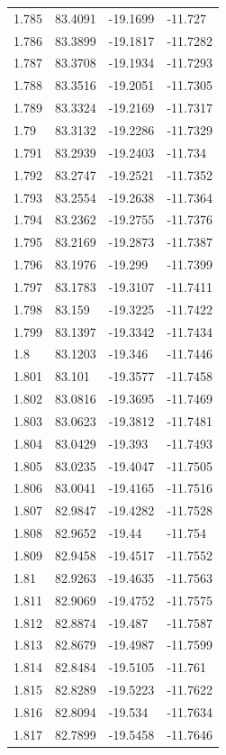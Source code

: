 \begin{tabular}{llll}
1.785 & 83.4091 & -19.1699 & -11.727 \\
1.786 & 83.3899 & -19.1817 & -11.7282 \\
1.787 & 83.3708 & -19.1934 & -11.7293 \\
1.788 & 83.3516 & -19.2051 & -11.7305 \\
1.789 & 83.3324 & -19.2169 & -11.7317 \\
1.79 & 83.3132 & -19.2286 & -11.7329 \\
1.791 & 83.2939 & -19.2403 & -11.734 \\
1.792 & 83.2747 & -19.2521 & -11.7352 \\
1.793 & 83.2554 & -19.2638 & -11.7364 \\
1.794 & 83.2362 & -19.2755 & -11.7376 \\
1.795 & 83.2169 & -19.2873 & -11.7387 \\
1.796 & 83.1976 & -19.299 & -11.7399 \\
1.797 & 83.1783 & -19.3107 & -11.7411 \\
1.798 & 83.159 & -19.3225 & -11.7422 \\
1.799 & 83.1397 & -19.3342 & -11.7434 \\
1.8 & 83.1203 & -19.346 & -11.7446 \\
1.801 & 83.101 & -19.3577 & -11.7458 \\
1.802 & 83.0816 & -19.3695 & -11.7469 \\
1.803 & 83.0623 & -19.3812 & -11.7481 \\
1.804 & 83.0429 & -19.393 & -11.7493 \\
1.805 & 83.0235 & -19.4047 & -11.7505 \\
1.806 & 83.0041 & -19.4165 & -11.7516 \\
1.807 & 82.9847 & -19.4282 & -11.7528 \\
1.808 & 82.9652 & -19.44 & -11.754 \\
1.809 & 82.9458 & -19.4517 & -11.7552 \\
1.81 & 82.9263 & -19.4635 & -11.7563 \\
1.811 & 82.9069 & -19.4752 & -11.7575 \\
1.812 & 82.8874 & -19.487 & -11.7587 \\
1.813 & 82.8679 & -19.4987 & -11.7599 \\
1.814 & 82.8484 & -19.5105 & -11.761 \\
1.815 & 82.8289 & -19.5223 & -11.7622 \\
1.816 & 82.8094 & -19.534 & -11.7634 \\
1.817 & 82.7899 & -19.5458 & -11.7646 \\

\end{tabular}
